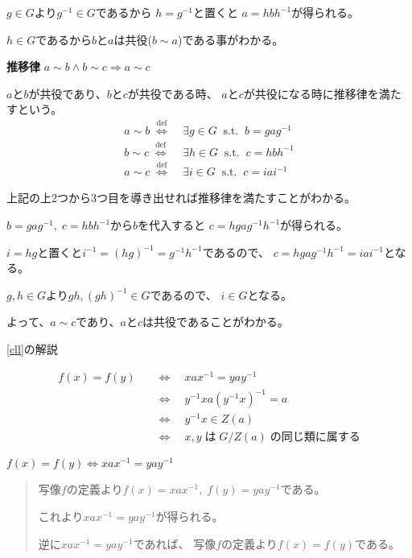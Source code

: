 \documentclass[12pt,b5paper]{ltjsarticle}
\begin{document}
$g\in G$より$g^{-1}\in G$であるから
$h=g^{-1}$と置くと
$a=hbh^{-1}$が得られる。

$h\in G$であるから$b$と$a$は共役($b\sim a$)である事がわかる。



\textbf{推移律}
$a \sim b \land b\sim c \Rightarrow a \sim c$

$a$と$b$が共役であり、$b$と$c$が共役である時、
$a$と$c$が共役になる時に推移律を満たすという。
\begin{align}
 a \sim b \; \overset{\mathrm{def}}{\Longleftrightarrow} & \;
  \exists g \in G \;\; \mathrm{s.t.} \;\; b=gag^{-1}\\
 b \sim c \; \overset{\mathrm{def}}{\Longleftrightarrow} & \;
  \exists h \in G \;\; \mathrm{s.t.} \;\; c=hbh^{-1}\\
 a \sim c \; \overset{\mathrm{def}}{\Longleftrightarrow} & \;
  \exists i \in G \;\; \mathrm{s.t.} \;\; c=iai^{-1}
\end{align}

上記の上2つから3つ目を導き出せれば推移律を満たすことがわかる。

$b=gag^{-1},\; c=hbh^{-1}$から$b$を代入すると
$c=hgag^{-1}h^{-1}$が得られる。

$i=hg$と置くと$i^{-1}=(hg)^{-1} = g^{-1}h^{-1}$であるので、
$c=hgag^{-1}h^{-1} = iai^{-1}$となる。

$g,h\in G$より$gh, (gh)^{-1}\in G$であるので、
$i\in G$となる。

よって、$a\sim c$であり、$a$と$c$は共役であることがわかる。

\dotfill

\eqref{cll}の解説

\begin{align}
 f(x)=f(y) \quad
 & \Longleftrightarrow \quad xax^{-1} = yay^{-1}\\
 & \Longleftrightarrow \quad y^{-1}xa(y^{-1}x)^{-1} = a\\
 & \Longleftrightarrow \quad y^{-1}x \in Z(a)\\
 & \Longleftrightarrow \quad x,y \; は \; G/Z(a) \; の同じ類に属する
\end{align}

$f(x)=f(y) \Longleftrightarrow xax^{-1} = yay^{-1}$
\begin{quote}
 写像$f$の定義より$f(x)=xax^{-1},\;f(y)=yay^{-1}$である。

 これより$xax^{-1}=yay^{-1}$が得られる。

 逆に$xax^{-1}=yay^{-1}$であれば、
 写像$f$の定義より$f(x)=f(y)$である。
\end{quote}
\end{document}
